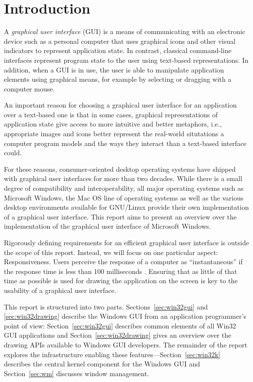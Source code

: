 	\section{Introduction}
		A \textit{graphical user interface} (GUI) is a means of communicating
		with an electronic device such as a personal computer that uses graphical
		icons and other visual indicators to represent application state. In
		contrast, classical command-line interfaces represent program state to
		the user using text-based representations. In addition, when a GUI is
		in use, the user is able to manipulate application elements using graphical
		means, for example by selecting or dragging with a computer mouse.

		An important reason for choosing a graphical user interface for an
		application over a text-based one is that in some cases, graphical
		representations of application state give access to more intuitive and
		better metaphors, i.e., appropriate images and icons better represent
		the real-world situtations a computer program models and the ways they
		interact than a text-based interface could.

		For these reasons, consumer-oriented desktop operating systems have
		shipped with graphical user interfaces for more than two decades. While
		there is a small degree of
		compatibility and interoperability, all major operating systems such
		as Microsoft Windows, the Mac OS line of operating systems as well
		as the various desktop environments available for GNU/Linux
		provide their own implementation of a graphical user interface. This
		report aims to present an overview over the implementation of the
		graphical user interface of Microsoft Windows.

		Rigorously defining requirements for an efficient graphical user
		interface is outside the scope of this report. Instead, we will focus
		on one particular aspect: Responsiveness. Users perceive the response
		of a computer as \enquote{instantaneous} if the response time is less
		than 100 milliseconds \cite{miller1968response}. Ensuring that as
		little of that time as possible is used for drawing the application on
		the screen is key to the usability of a graphical user interface.

		This report is structured into two parts. Sections~\ref{sec:win32gui} and
		\ref{sec:win32drawing} describe the Windows GUI from an application
		programmer's point of view: Section~\ref{sec:win32gui} describes common
		elements of all Win32 GUI applications and Section~\ref{sec:win32drawing}
		gives an overview over the drawing APIs available to Windows GUI developers.
		The remainder of the report explores the infrastructure enabling
		these features---Section~\ref{sec:win32k} describes the central kernel component
		for the Windows GUI and Section~\ref{sec:wm} discusses window management.


